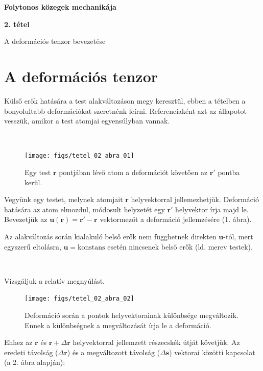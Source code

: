 \documentclass[a4paper, 12pt]{article}
\begin{document}
\begin{titlepage}\centering
\vspace*{250 pt}
\Huge \textbf{Folytonos közegek mechanikája}

\LARGE \textbf{2. tétel}

\LARGE A deformációs tenzor bevezetése

\vspace*{\fill}
\end{titlepage}

\newpage
\part*{\Large{A deformációs tenzor}}

\vspace{30 pt}

Külső erők hatására a test alakváltozáson megy keresztül, ebben a tételben a bonyolultabb deformációkat szeretnénk leírni. Referenciaként azt az állapotot vesszük, amikor a test atomjai egyensúlyban vannak.

~

\begin{figure}[htbp]
\centering
\texttt{[image: figs/tetel\_02\_abra\_01]}
\caption{Egy test ${\mathbf{r}}$ pontjában lévő atom a deformációt követően az ${\mathbf{r}}'$ pontba kerül.}
\end{figure}

Vegyünk egy testet, melynek atomjait $\mathbf{r}$ helyvektorral jellemezhetjük. Deformáció hatására az atom elmozdul, módosult helyzetét egy $\mathbf{r'}$ helyvektor írja majd le. Bevezetjük az $\mathbf{u(r)}=\mathbf{r'}-\mathbf{r}$ vektormezőt a deformáció jellemzésére (1. ábra).

Az alakváltozás során kialakuló belső erők nem függhetnek direkten $\mathbf{u}$-tól, mert egyszerű eltolásra, $\mathbf{u}=\mathrm{konstans}$ esetén nincsenek belső erők (ld. merev testek).

~

Vizsgáljuk a relatív megnyúlást.

\begin{figure}[htbp]
\centering
\texttt{[image: figs/tetel\_02\_abra\_02]}
\caption{Deformáció során a pontok helyvektorainak különbsége megváltozik. Ennek a különbségnek a megváltozását írja le a deformáció.}
\end{figure}

Ehhez az $\mathbf{r}$ és $\mathbf{r}+\Delta\mathbf{r}$ helyvektorral jellemzett részecskék útját követjük. Az eredeti távolság ($\Delta\mathbf{r}$) és a megváltozott távolság ($\Delta\mathbf{s}$) vektorai közötti kapcsolat (a 2. ábra alapján):
\end{document}
